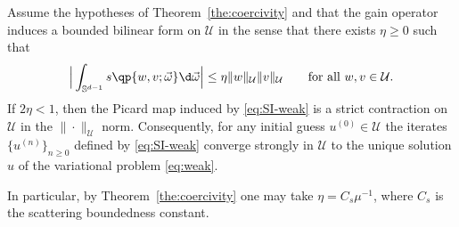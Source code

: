 \documentclass[final]{amsart}
\begin{document}
\begin{proposition}
\label{prop:SI-continuum}
Assume the hypotheses of Theorem~\ref{the:coercivity} and that
the gain operator induces a bounded bilinear form on $\mathcal{U}$ in
the sense that there exists $\eta\ge 0$ such that
\begin{equation}
  \label{eq:K-U-bound}
  \Big|\int_{\mathbb{S}^{d-1}} s\qp{w,v;\vec{\omega}} \d\vec{\omega}\Big|
  \le
  \eta  \|w\|_{\mathcal{U}} \|v\|_{\mathcal{U}}
  \qquad \text{for all } w,v\in\mathcal{U}.
\end{equation}
If $2\eta<1$, then the Picard map induced by \eqref{eq:SI-weak} is a
strict contraction on $\mathcal{U}$ in the $\|\cdot\|_{\mathcal U}$ norm.
Consequently, for any initial guess $u^{(0)}\in\mathcal U$ the iterates
$\{u^{(n)}\}_{n\ge 0}$ defined by \eqref{eq:SI-weak} converge strongly in
$\mathcal{U}$ to the unique solution $u$ of the variational problem
\eqref{eq:weak}.

In particular, by Theorem~\ref{the:coercivity} one may take
$\eta = C_s \mu^{-1}$, where $C_s$ is the scattering boundedness
constant.
\end{proposition}
\end{document}
